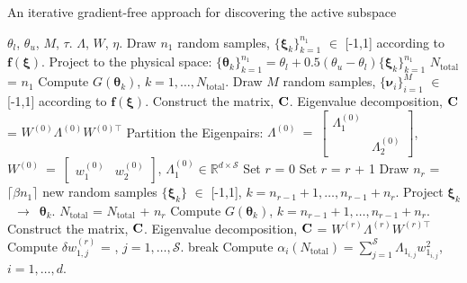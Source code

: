\bigskip
\begin{breakablealgorithm}
\renewcommand{\algorithmicrequire}{\textbf{Input:}}
\renewcommand{\algorithmicensure}{\textbf{Output:}}
  \caption{An iterative gradient-free approach for discovering the active subspace}
  \begin{algorithmic}[1]
\Require $\theta_l$, $\theta_u$, $M$, $\tau$. 
\Ensure $\Lambda$, $W$, $\eta$. 
	\State Draw $n_1$ random samples, $\{\bm{\xi}_k\}_{k=1}^{n_1}$ $\in$ [-1,1]
         according to $\bm{f(\xi)}$.
	\State Project to the physical space:
        $\{\bm{\theta}_k\}_{k=1}^{n_1}=\theta_l+0.5(\theta_u-\theta_l)\{\bm{\xi}_k\}_{k=1}^{n_1}$
	\State $N_\text{total}$ = $n_1$ 
	\State Compute $G(\bm\theta_k)$, $k=1, \ldots, N_\text{total}$.
	\State Draw $M$ random samples, $\{\bm{\nu}_i\}_{i=1}^{M}$ $\in$ [-1,1]
         according to $\bm{f(\xi)}$.
	\State Construct the matrix, $\mathbf{{C}}$.
	\State Eigenvalue decomposition, $\mathbf{{C}}$ = $W^{(0)}\Lambda^{(0)} W^{(0)\top}$
	\State Partition the Eigenpairs: $\Lambda^{(0)}~=~ 
        \begin{bmatrix} \Lambda_1^{(0)} & \\ & \Lambda_2^{(0)} \end{bmatrix}$, 
        $W^{(0)}~=~\begin{bmatrix} w_1^{(0)} & w_2^{(0)} \end{bmatrix}$, 
        $\Lambda_1^{(0)}\in \mathbb{R}^{d\times\mathcal{S}}$
	\State Set $r$ = 0
	\Loop
		\State Set $r$ = $r$ + 1
		\State Draw $n_r$ = $\lceil \beta n_1 \rceil$ new random samples 
                $\{\bm{\xi}_k\}$ $\in$ [-1,1], $k = n_{r-1}+1,\ldots,n_{r-1}+n_r$.
		\State Project $\bm{\xi}_k$~$\rightarrow$~$\bm{\theta}_k$.
		\State $N_\text{total}$ = $N_\text{total}$ + $n_r$ 
		\State Compute $G(\bm\theta_k)$, $k=n_{r-1}+1, \ldots, n_{r-1}+n_r$.  
		\State Construct the matrix, $\mathbf{{C}}$.
		\State Eigenvalue decomposition, $\mathbf{{C}}$ = $W^{(r)}\Lambda^{(r)} W^{(r)\top}$
		\State Compute $\delta w_{1,j}^{(r)}$ = 
                       , 
                       $j = 1,\ldots,\mathcal{S}$.
			\State break
		\EndIf
	\EndLoop
	\State Compute $\alpha_i(N_\text{total}) = \sum\limits_{j=1}^{\mathcal{S}} \Lambda_{1_{i,j}}w_{1_{i,j}}^2$,
	$i=1,\ldots,d$.
    \EndProcedure
  \end{algorithmic}
  \label{alg:free1}
\end{breakablealgorithm}
\bigskip

